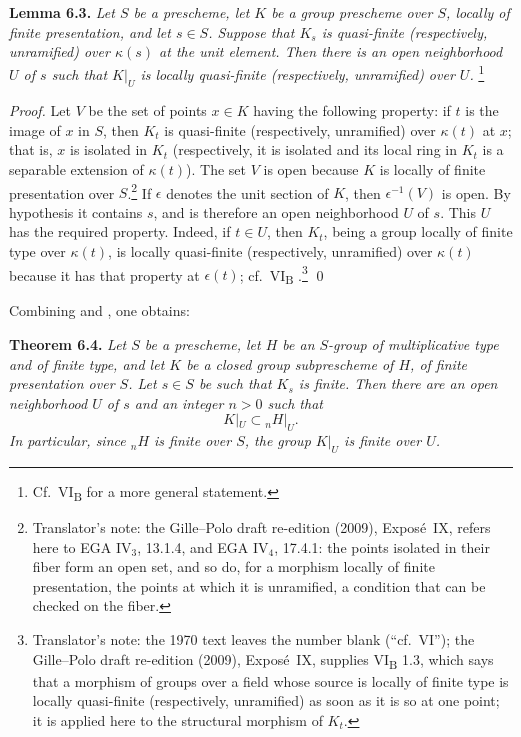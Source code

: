 \medskip
\noindent{}\textbf{Lemma 6.3.}
\textit{Let \(S\) be a prescheme, let \(K\) be a group prescheme over
\(S\), locally of finite presentation, and let \(s\in S\). Suppose that
\(K_s\) is quasi-finite (respectively, unramified) over \(\kappa(s)\) at
the unit element. Then there is an open neighborhood \(U\) of \(s\) such
that \(K|_U\) is locally quasi-finite (respectively, unramified) over
\(U\).}%
\begingroup
\renewcommand{\thefootnote}{\(\ast\)}%
\footnote{Cf.\ VI\textsubscript{B}  for a more general
statement.}%
\addtocounter{footnote}{-1}%
\endgroup

\emph{Proof.}
Let \(V\) be the set of points \(x\in K\) having the following
property: if \(t\) is the image of \(x\) in \(S\), then \(K_t\) is
quasi-finite (respectively, unramified) over \(\kappa(t)\) at \(x\);
that is, \(x\) is isolated in \(K_t\) (respectively, it is isolated and
its local ring in \(K_t\) is a separable extension of \(\kappa(t)\)).
The set \(V\) is open because \(K\) is locally of finite presentation
over \(S\).\footnote{Translator's note: the Gille--Polo draft re-edition
(2009), Expos\'e~IX, refers here to EGA IV\(_3\), 13.1.4, and EGA
IV\(_4\), 17.4.1: the points isolated in their fiber form an open set, and so
do, for a morphism locally of finite presentation, the points at which it is
unramified, a condition that can be checked on the fiber.}
If \(\epsilon\) denotes the unit section of \(K\), then
\(\epsilon^{-1}(V)\) is open. By hypothesis it contains \(s\), and is
therefore an open neighborhood \(U\) of \(s\). This \(U\) has the
required property. Indeed, if \(t\in U\), then \(K_t\), being a group
locally of finite type over \(\kappa(t)\), is locally quasi-finite
(respectively, unramified) over \(\kappa(t)\) because it has that
property at \(\epsilon(t)\); cf.\ VI\textsubscript{B} .\footnote{Translator's
note: the 1970 text leaves the number blank (``cf.\ VI''); the Gille--Polo
draft re-edition (2009), Expos\'e~IX, supplies VI\textsubscript{B} 1.3,
which says that a morphism of groups over a field whose source is locally of
finite type is locally quasi-finite (respectively, unramified) as soon as it
is so at one point; it is applied here to the structural morphism of
\(K_t\).} \qed

Combining  and
, one obtains:

\medskip
\noindent{}\textbf{Theorem 6.4.}
\textit{Let \(S\) be a prescheme, let \(H\) be an \(S\)-group of
multiplicative type and of finite type, and let \(K\) be a closed group
subprescheme of \(H\), of finite presentation over \(S\). Let \(s\in S\)
be such that \(K_s\) is finite. Then there are an open neighborhood
\(U\) of \(s\) and an integer \(n>0\) such that
\[
  K|_U\subset {}_nH|_U.
\]
In particular, since \({}_nH\) is finite over \(S\), the group
\(K|_U\) is finite over \(U\).}

